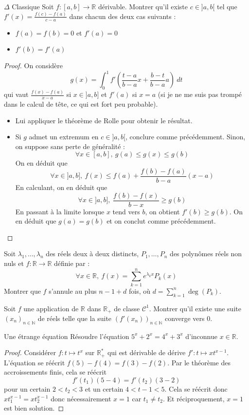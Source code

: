 \documentclass[french,a4paper]{article}
\newcommand{\N}{\mathbb{N}}
\newcommand{\R}{\mathbb{R}}
\newcommand{\st}{^*}
\theoremstyle{plain}
\theoremstyle{definition}
\theoremstyle{remark}
\begin{document}
\begin{ex}[Moulin.FV.04]{$\Delta$ Classique}
	Soit $f:[a,b]\to\R$ dérivable. Montrer qu'il existe $c\in]a,b[$ tel que $\displaystyle f'(x)=\frac{f(c)-f(a)}{c-a}$ dans chacun des deux cas suivants : 
	\begin{itemize}
		\item $f(a)=f(b)=0$ et $f'(a)=0$
		\item $f'(b)=f'(a)$
	\end{itemize}
\end{ex}
\begin{proof}
	On considère $$g(x)=\int_{0}^{1}f'\left(\frac{t-a}{b-a}x+\frac{b-t}{b-a}a\right)\ dt$$ qui vaut $\displaystyle\frac{f(x)-f(a)}{x-a}$ si $x\in]a,b]$ et $f'(a)$ si $x=a$ (si je ne me suis pas trompé dans le calcul de tête, ce qui est fort peu probable).
	\begin{itemize}
		\item Lui appliquer le théorème de Rolle pour obtenir le résultat.
		\item Si $g$ admet un extremum en $c\in]a,b[$, conclure comme précédemment. Sinon, on suppose sans perte de généralité : $$\forall x\in[a,b],\ g(a)\leqslant g(x)\leqslant g(b)$$ On en déduit que $$\forall x\in]a,b],\ f(x)\leqslant f(a)+\frac{f(b)-f(a)}{b-a}(x-a)$$ En calculant, on en déduit que $$\forall x\in]a,b],\ \frac{f(b)-f(x)}{b-x}\geqslant g(b)$$ En passant à la limite lorsque $x$ tend vers $b$, on obtient $f'(b)\geqslant g(b)$. On en déduit que $g(a)=g(b)$ et on conclut comme précédemment.
	\end{itemize}
\end{proof}

\begin{ex}[Moulin.FV.05]{}
	Soit $\lambda_1,\ldots,\lambda_n$ des réels deux à deux distincts, $P_1,\ldots,P_n$ des polynômes réels non nuls et $f:\R\to\R$ définie par : $$\forall x\in\R,\ f(x)=\sum_{k=1}^{n}e^{\lambda_k x}P_k(x)$$ Montrer que $f$ s'annule au plus $n-1+d$ fois, où $d=\displaystyle\sum_{k=1}^{n}\deg(P_k)$.
\end{ex}

\begin{ex}[Moulin.FV.06]{}
	Soit $f$ une application de $\R$ dans $\R_+$ de classe $\mathcal{C}^1$. Montrer qu'il existe une suite $(x_n)_{n\in\N}$ de réels telle que la suite $(f'(x_n))_{n\in\N}$ converge vers $0$.
\end{ex}

\begin{ex}[?]{Une étrange équation}
	Résoudre l'équation $5^x+2^x=4^x+3^x$ d'inconnue $x\in\R$.
\end{ex}
\begin{proof}
	Considérer $f:t\mapsto t^x$ sur $\R_+\st$ qui est dérivable de dérive $f':t\mapsto xt^{x-1}$. L'équation se réécrit $f(5)-f(4)=f(3)-f(2)$. Par le théorème des accroissements finis, cela se réécrit $$f'(t_1)(5-4)=f'(t_2)(3-2)$$ pour un certain $2<t_2<3$ et un certain $4<t-1<5$. Cela se réécrit donc $xt_1^{x-1}=xt_2^{x-1}$ donc nécessairement $x=1$ car $t_1\ne t_2$. Et réciproquement, $x=1$ est bien solution.
\end{proof}
\end{document}
